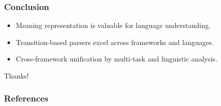 \documentclass[t,xcolor={svgnames,table}]{beamer}
\begin{document}
\begin{frame}
\frametitle{Conclusion}
\begin{itemize}
 \item Meaning representation is valuable for language understanding.\pause
 \item Transition-based parsers excel across frameworks and languages.\pause
 \item Cross-framework unification by multi-task and linguistic analysis.
\end{itemize}

\vfill
\begin{flushright}
Thanks!
\end{flushright}

\end{frame}

\begin{frame}[allowframebreaks]
\frametitle{References}

\tiny
\end{frame}
\end{document}
